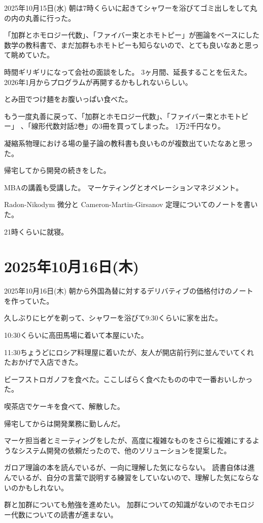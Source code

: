 \documentclass[dvipdfmx, autodetect-engine, aspectratio=169, 10.5pt]{beamer}
\begin{document}
\begin{frame}{2025年10月15日(水)}
\scriptsize
朝は7時くらいに起きてシャワーを浴びてゴミ出しをして丸の内の丸善に行った。

「加群とホモロジー代数」、「ファイバー束とホモトピー」が圏論をベースにした数学の教科書で、まだ加群もホモトピーも知らないので、とても良いなあと思って眺めていた。

時間ギリギリになって会社の面談をした。
3ヶ月間、延長することを伝えた。
2026年1月からプログラムが再開するかもしれないらしい。

とみ田でつけ麺をお腹いっぱい食べた。

もう一度丸善に戻って、「加群とホモロジー代数」、「ファイバー束とホモトピー」 、「線形代数対話2巻」の3冊を買ってしまった。
1万2千円なり。

凝縮系物理における場の量子論の教科書も良いものが複数出ていたなあと思った。

帰宅してから開発の続きをした。

MBAの講義も受講した。
マーケティングとオペレーションマネジメント。

Radon-Nikodym 微分と Cameron-Martin-Girsanov 定理についてのノートを書いた。

21時くらいに就寝。
\end{frame}

\section{2025年10月16日(木)}

\begin{frame}{2025年10月16日(木)}
朝から外国為替に対するデリバティブの価格付けのノートを作っていた。

久しぶりにヒゲを剃って、シャワーを浴びて9:30くらいに家を出た。

10:30くらいに高田馬場に着いて本屋にいた。

11:30ちょうどにロシア料理屋に着いたが、友人が開店前行列に並んでいてくれたおかげで入店できた。

ビーフストロガノフを食べた。ここしばらく食べたものの中で一番おいしかった。

喫茶店でケーキを食べて、解散した。

帰宅してからは開発業務に勤しんだ。

マーケ担当者とミーティングをしたが、高度に複雑なものをさらに複雑にするようなシステム開発の依頼だったので、他のソリューションを提案した。

ガロア理論の本を読んでいるが、一向に理解した気にならない。
読書自体は進んでいるが、自分の言葉で説明する練習をしていないので、理解した気にならないのかもしれない。

群と加群についても勉強を進めたい。
加群についての知識がないのでホモロジー代数についての読書が進まない。
\end{frame}
\end{document}
